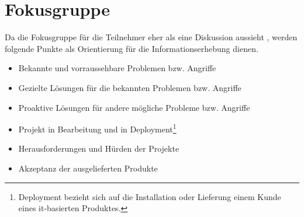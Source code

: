 \section{Fokusgruppe}\label{appendix:focus_gruppe}

Da die Fokusgruppe für die Teilnehmer eher als eine Diskussion aussieht \cite{refbook:APGF}, werden folgende Punkte
als Orientierung für die Informationserhebung dienen.

\begin{itemize}
    \item Bekannte und vorraussehbare Problemen bzw. Angriffe
    \item Gezielte Lösungen für die bekannten Problemen bzw. Angriffe
    \item Proaktive Lösungen für andere mögliche Probleme bzw. Angriffe
    \item Projekt in Bearbeitung und in Deployment\footnote{Deployment bezieht sich auf die Installation oder Lieferung
    einem Kunde eines it-basierten Produktes.}
    \item Herausforderungen und Hürden der Projekte
    \item Akzeptanz der ausgelieferten Produkte
\end{itemize}

